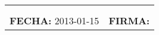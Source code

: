 \documentclass[10pt,a4paper]{article}
\begin{document}
\begin{center}
{\begin{tabular}{|p{2.8cm}p{2.8cm}p{2.8cm}p{2.8cm}|}
\hline 
\multicolumn{1}{l}{\scriptsize{}}&&& \multicolumn{1}{l}{ \scriptsize{}}\\
\multicolumn{1}{l}{\scriptsize{}}&&& \multicolumn{1}{l}{ \scriptsize{}}\\
\multicolumn{2}{l}{\begin{minipage}[t]{5.5 cm}\scriptsize{\textbf{FECHA: }2013-01-15}\end{minipage}}&\multicolumn{2}{l}{\begin{minipage}[t]{5.5 cm}\scriptsize{\textbf{FIRMA: }}\end{minipage}}\\
\end{tabular}}

\end{center}
\vspace{0.6cm}
\hspace{13cm}
\end{document}
